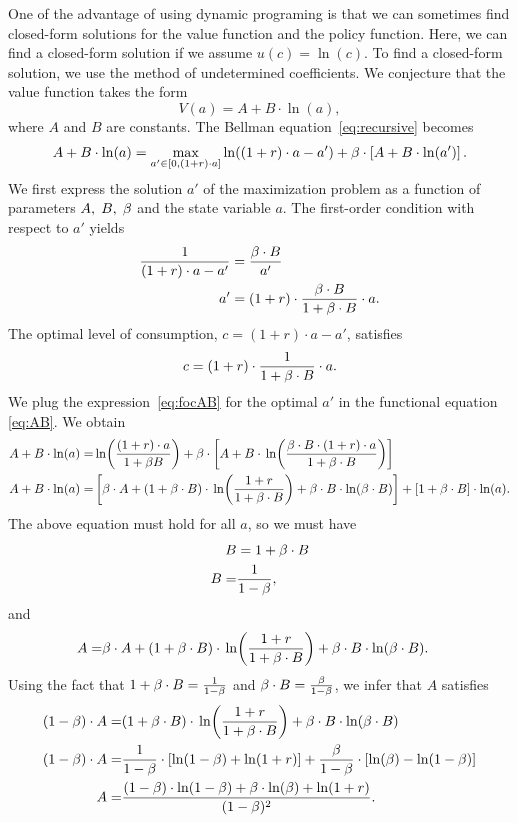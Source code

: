 \documentclass[letterpaper,12pt,leqno]{article}
\begin{document}
One of the advantage of using dynamic programing is that we can sometimes find closed-form solutions for the value function and the policy function. Here, we can find a closed-form solution if we assume $u(c)=\ln(c)$. To find a closed-form solution, we use the method of undetermined coefficients. We conjecture that the value function takes the form
\begin{equation}
V(a)=A+B \cdot \ln(a)\label{eq:fun},
\end{equation}
where $A$ and $B$ are constants. The Bellman equation~\eqref{eq:recursive} becomes
\begin{equation}
A+B \cdot \ln(a)=\max_{a'\in[0,(1+r)\cdot a]}\ln((1+r)\cdot a-a')+\b  \cdot \bs{A+B \cdot \ln(a')}\label{eq:AB}.
\end{equation}
We first express the solution $a'$ of the maximization problem as a function of parameters $A,\;B,\;\beta$ and the state variable $a$. The first-order condition with respect to $a'$ yields
\begin{align}
\frac{1}{(1+r)\cdot a-a'}&=\frac{\beta  \cdot B}{a'}\nonumber\\
a'&=(1+r)\cdot \frac{\beta  \cdot B}{1+\beta \cdot  B} \cdot a \label{eq:focAB}.
\end{align}
The optimal level of consumption, $c=(1+r)\cdot a-a'$,  satisfies
\[c=(1+r)\cdot \frac{1}{1+\beta \cdot  B} \cdot a. \]
We plug the expression~\eqref{eq:focAB} for the optimal $a'$ in the functional equation \eqref{eq:AB}. We obtain
\begin{align*}
A+B\cdot\ln(a)=&\ln{\frac{(1+r)\cdot a}{1+\b B}}+\b\cdot \bs{A+B\cdot \ln{\frac{\b \cdot B  \cdot (1+r)\cdot a}{1+\b  \cdot  B}}}\\
A+B\cdot\ln(a)=&\bs{ \b  \cdot A+ (1+\b \cdot  B)\cdot \ln{\frac{1+r}{1+\b \cdot B}}+\b  \cdot B \cdot  \ln(\b \cdot  B)} + \bs{ 1+\b  \cdot B}\cdot  \ln(a).
\end{align*}
The above equation must hold for all $a$, so we must have
\begin{align}
B&=  1+\beta  \cdot B\nonumber\\
B=&\frac{1}{1-\beta}\label{eq:eqB},
\end{align}
and
\begin{align*}
A=&\b \cdot  A+(1+\b \cdot  B)\cdot \ln{\frac{1+r}{1+\b \cdot B}}+\b \cdot  B  \cdot \ln(\b  \cdot B).
\end{align*}
Using the fact that  $1+\beta  \cdot B=\frac{1}{1-\beta}$ and $\beta \cdot  B=\frac{\beta}{1-\beta}$, we infer that $A$ satisfies
\begin{align}
\bp{1-\b}\cdot A=&(1+\b  \cdot B)\cdot \ln{\frac{1+r}{1+\b \cdot B}}+\b\cdot  B\cdot  \ln(\b \cdot  B)\nonumber\\
\bp{1-\b}\cdot  A=&\frac{1}{1-\b}\cdot \bs{\ln(1-\b)+\ln(1+r)}+\frac{\b}{1-\b}\cdot  \bs{\ln(\b)-\ln(1-\b)}\nonumber\\
A=&\frac{(1-\b)\cdot \ln(1-\b)+\b\cdot  \ln(\b)+\ln(1+r)}{(1-\b)^2}\label{eq:eqA}.
\end{align}
\end{document}
